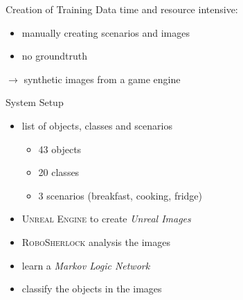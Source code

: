 \documentclass[]{beamer}
\begin{document}
\begin{frame}{Creation of Training Data}
time and resource intensive:
	\begin{itemize}
		\item manually creating scenarios and images
		\item no groundtruth
	\end{itemize}
	\bigskip
$\rightarrow$ synthetic images from a game engine
\end{frame}

\begin{frame}{System Setup}
	\begin{itemize}
		\item list of objects, classes and scenarios
			\begin{itemize}
				\item 43 objects
				\item 20 classes
				\item 3 scenarios (breakfast, cooking, fridge)
			\end{itemize}
		\item \textsc{Unreal Engine} to create \textit{Unreal Images}
		\item \textsc{RoboSherlock} analysis the images
		\item learn a \textit{Markov Logic Network} 
		\item classify the objects in the images
	\end{itemize}
\end{frame}
\end{document}
